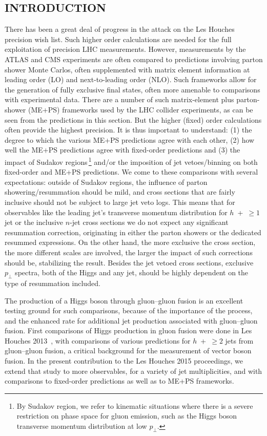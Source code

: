 \subsection{INTRODUCTION}
\label{sec:hjetscomp:intro}

There has been a great deal of progress in
the attack on the Les Houches precision wish list. Such higher order
calculations are needed for the full exploitation of precision LHC
measurements. However, measurements by the ATLAS and CMS experiments are 
often compared 
to predictions involving parton shower Monte Carlos, often
supplemented with matrix element information at leading order (LO) and
next-to-leading order (NLO). Such frameworks allow for the generation
of fully exclusive final states, often more amenable to comparisons
with experimental data. There are a number of such matrix-element plus
parton-shower (ME+PS) frameworks used by the LHC collider experiments,
as can be seen from the predictions in this section. But the higher
(fixed) order calculations often provide the highest precision. It is
thus important to understand: (1) the degree to which the various
ME+PS predictions agree with each other, (2) how well the ME+PS
predictions agree with fixed-order predictions and (3) the impact of
Sudakov regions\,\footnote{By Sudakov region, we refer to kinematic
situations where there is a severe restriction on phase space for
gluon emission, such as the Higgs boson transverse momentum
distribution at low $p_\perp$.} and/or the imposition of jet
vetoes/binning on both fixed-order and ME+PS predictions.  We come to
these comparisons with several expectations: outside of Sudakov regions, the
influence of parton showering/resummation should be mild, and cross
sections that are fairly inclusive should not be subject to
large jet veto logs. This means that for observables like the leading 
jet's transverse momentum distribution for $h$~+~$\ge1$ jet or the 
inclusive $n$-jet cross sections we do not expect any 
significant resummation correction, originating in either the parton 
showers or the dedicated resummed expressions. On the other hand, 
the more exclusive the cross section, the more different scales are 
involved, the larger the impact of such corrections should be, 
stabilizing the result. Besides the jet vetoed cross sections, 
exclusive $p_\perp$ spectra, both of the Higgs and any jet, should 
be highly dependent on the type of resummation included.

The production of a Higgs boson through gluon--gluon fusion is an
excellent testing ground for such comparisons, because of the
importance of the process, and the enhanced rate for additional jet
production associated with gluon--gluon fusion. First comparisons of 
Higgs production in gluon fusion were done in Les Houches
2013~\cite{AlcarazMaestre:2012vp}, with comparisons of various
predictions for $h$~+~$\ge2$ jets from gluon--gluon fusion, a critical
background for the measurement of vector boson fusion. In the present 
contribution to the Les Houches 2015 proceedings, we extend that study
to more observables, for a variety of jet multiplicities, and with
comparisons to fixed-order predictions as well as to ME+PS frameworks.

